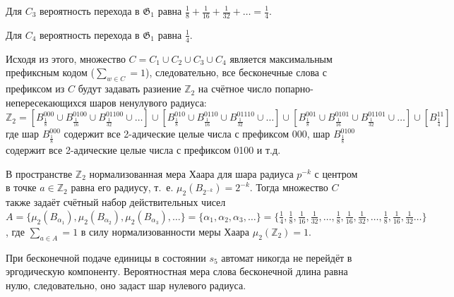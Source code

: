 \documentclass[coursework, och]{SCWorks1}
\begin{document}
Для $C_3$ вероятность перехода в $\mathfrak{G}_1$ равна $\frac{1}{8} + \frac{1}{16} + \frac{1}{32} + \dots = \frac{1}{4}$.

Для $C_4$ вероятность перехода в $\mathfrak{G}_1$ равна $\frac{1}{4}$.

Исходя из этого, множество $C = C_1 \cup C_2 \cup C_3 \cup C_4$ является максимальным префиксным кодом ($\sum_{w \in C} = 1$), следовательно, все бесконечные слова с префиксом из $C$ будут задавать разиение $\mathbb{Z}_2$ на счётное число попарно-непересекающихся шаров ненулувого радиуса:
\[
    \mathbb{Z}_2 = [B_{\frac{1}{8}}^{000} \cup B_{\frac{1}{16}}^{0100} \cup B_{\frac{1}{32}}^{01100} \cup \dots] \cup [B_{\frac{1}{8}}^{010} \cup B_{\frac{1}{16}}^{0110} \cup B_{\frac{1}{32}}^{01110} \cup \dots] \cup [B_{\frac{1}{8}}^{001} \cup B_{\frac{1}{16}}^{0101} \cup B_{\frac{1}{32}}^{01101} \cup \dots] \cup [B_{\frac{1}{4}}^{11}]
\]
где шар $B_{\frac{1}{8}}^{000}$ содержит все 2-адические целые числа с префиксом 000, шар $B_{\frac{1}{8}}^{0100}$ содержит все 2-адические целые числа с префиксом 0100 и т.д.

В пространстве $\mathbb{Z}_2$ нормализованная мера Хаара для шара радиуса $p^{-k}$ с центром в точке $a \in \mathbb{Z}_2$ равна его радиусу, т.~е. $\mu_2(B_{2^{-k}}) = 2^{-k}$. Тогда множество $C$  также задаёт счётный набор действительных чисел $A = \{\mu_2(B_{\alpha_1}), \mu_2(B_{\alpha_2}), \mu_2(B_{\alpha_3}), \dots\} = \{\alpha_1, \alpha_2, \alpha_3, \dots\} = \{\frac{1}{4}, \frac{1}{8}, \frac{1}{16}, \frac{1}{32}, \dots, \frac{1}{8}, \frac{1}{16}, \frac{1}{32}, \dots, \frac{1}{8}, \frac{1}{16}, \frac{1}{32}\dots\}$, где $\sum_{a \in A} = 1$ в силу нормализованности меры Хаара $\mu_2(\mathbb{Z}_2) = 1$.

При бесконечной подаче единицы в состоянии $s_5$ автомат никогда не перейдёт в эргодическую компоненту. Вероятностная мера слова бесконечной длина равна нулю, следовательно, оно задаст шар нулевого радиуса.

\begin{Verbatim}[numbers=left]

\end{Verbatim}



\end{document}
